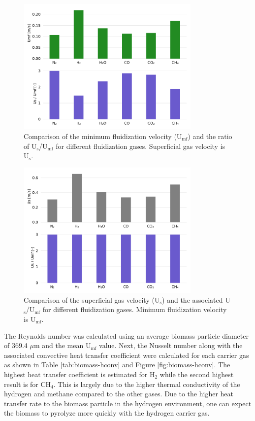 \begin{figure}[H]
    \centering
    \includegraphics[width=0.8\textwidth]{figures/umf-usumf-gases.pdf}
    \caption{Comparison of the minimum fluidization velocity (U$_\text{mf}$) and the ratio of U$_\text{s}$/U$_\text{mf}$ for different fluidization gases. Superficial gas velocity is U$_\text{s}$.}
    \label{fig:umf-usumf-gases}
\end{figure}

\begin{figure}[H]
    \centering
    \includegraphics[width=0.8\textwidth]{figures/us-usumf-gases.pdf}
    \caption{Comparison of the superficial gas velocity (U$_\text{s}$) and the associated U$_\text{s}$/U$_\text{mf}$ for different fluidization gases. Minimum fluidization velocity is U$_\text{mf}$.}
    \label{fig:us-usumf-gases}
\end{figure}

The Reynolds number was calculated using an average biomass particle diameter of 369.4 $\mu$m and the mean U$_\text{mf}$ value. Next, the Nusselt number along with the associated convective heat transfer coefficient were calculated for each carrier gas as shown in Table \ref{tab:biomass-hconv} and Figure \ref{fig:biomass-hconv}. The highest heat transfer coefficient is estimated for H$_2$ while the second highest result is for CH$_4$. This is largely due to the higher thermal conductivity of the hydrogen and methane compared to the other gases. Due to the higher heat transfer rate to the biomass particle in the hydrogen environment, one can expect the biomass to pyrolyze more quickly with the hydrogen carrier gas.


